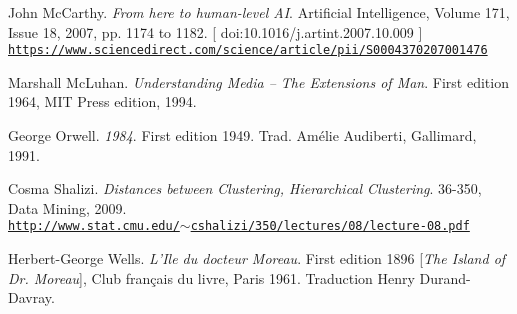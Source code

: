 \begin{thebibliography}{99}
	 John McCarthy. \textit{From here to human-level AI}. 
	 Artificial Intelligence, Volume 171, Issue 18, 2007, pp. 1174 to 1182. {\scriptsize [ doi:10.1016/j.artint.2007.10.009 ]}
	 \\ \href{https://www.sciencedirect.com/science/article/pii/S0004370207001476}{\scriptsize{\texttt{https://www.sciencedirect.com/science/article/pii/S0004370207001476}}} \normalsize{}
	 
	Marshall McLuhan. \textit{Understanding Media -- The Extensions of  Man}. First edition 1964, MIT Press edition, 1994.
	
	 George Orwell. \textit{1984}. First edition 1949. Trad. Amélie Audiberti, Gallimard, 1991.
				 
	 Cosma Shalizi. \textit{Distances between Clustering, Hierarchical Clustering}. 
	 36-350, Data Mining, 2009.\\ \href{http://www.stat.cmu.edu/\~cshalizi/350/lectures/08/lecture-08.pdf}{\scriptsize{\texttt{http://www.stat.cmu.edu/$\sim$cshalizi/350/lectures/08/lecture-08.pdf}}} \normalsize{}
	 
	Herbert-George Wells. \textit{L'Ile du docteur Moreau}. First edition 1896 [\textit{The Island of Dr. Moreau}], Club fran\c{c}ais du livre, Paris 1961. Traduction Henry Durand-Davray. 
		 
\end{thebibliography}